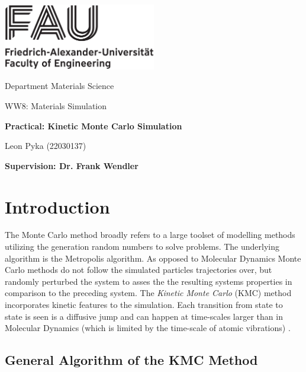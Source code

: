 




%
\begin{titlepage}
\begin{center}
\includegraphics[width=0.5\textwidth]{graphics/FAU_TechFak_EN_H_black.eps}

\LARGE Department Materials Science

\Large WW8: Materials Simulation

\LARGE \textbf{Practical: Kinetic Monte Carlo Simulation}



\vfil
\Large Leon Pyka (22030137)



\Large \textbf{Supervision: Dr. Frank Wendler}
\end{center}

\thispagestyle{empty}
%
\end{titlepage}
%

\setcounter{page}{1}
\tableofcontents
\newpage

\section{Introduction}
The Monte Carlo method broadly refers to a large toolset of modelling methods utilizing the generation random numbers to solve problems. The underlying algorithm is the Metropolis algorithm. As opposed to Molecular Dynamics Monte Carlo methods do not follow the simulated particles trajectories over, but randomly perturbed the system to asses the the resulting systems properties in comparison to the preceding system. The  \textit{Kinetic Monte Carlo} (KMC) method incorporates kinetic features to the simulation. Each transition from state to state is seen is a diffusive jump and can happen at time-scales larger than in Molecular Dynamics (which is limited by the time-scale of atomic vibrations) \cite{voter2007}. 


\subsection{General Algorithm of the KMC Method}

